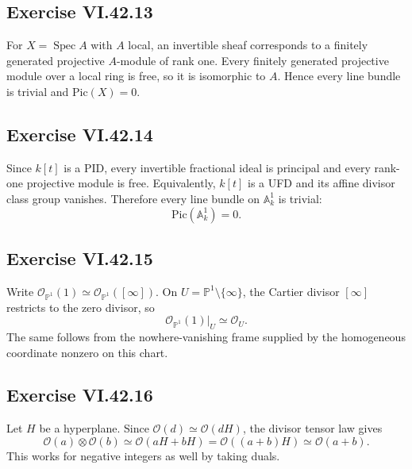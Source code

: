 \subsection*{Exercise VI.42.13}
\begin{solution}
For \(X=\operatorname{Spec}A\) with \(A\) local, an invertible sheaf corresponds to a finitely generated projective \(A\)-module of rank one.  Every finitely generated projective module over a local ring is free, so it is isomorphic to \(A\).  Hence every line bundle is trivial and \(\mathrm{Pic}(X)=0\).
\end{solution}

\subsection*{Exercise VI.42.14}
\begin{solution}
Since \(k[t]\) is a PID, every invertible fractional ideal is principal and every rank-one projective module is free.  Equivalently, \(k[t]\) is a UFD and its affine divisor class group vanishes.  Therefore every line bundle on \(\mathbb A^1_k\) is trivial:
\[
\mathrm{Pic}(\mathbb A^1_k)=0.
\]
\end{solution}

\subsection*{Exercise VI.42.15}
\begin{solution}
Write \(\mathcal O_{\mathbb P^1}(1)\simeq\mathcal O_{\mathbb P^1}([\infty])\).  On \(U=\mathbb P^1\setminus\{\infty\}\), the Cartier divisor \([\infty]\) restricts to the zero divisor, so
\[
\mathcal O_{\mathbb P^1}(1)|_U\simeq\mathcal O_U.
\]
The same follows from the nowhere-vanishing frame supplied by the homogeneous coordinate nonzero on this chart.
\end{solution}

\subsection*{Exercise VI.42.16}
\begin{solution}
Let \(H\) be a hyperplane.  Since \(\mathcal O(d)\simeq\mathcal O(dH)\), the divisor tensor law gives
\[
\mathcal O(a)\otimes\mathcal O(b)
\simeq\mathcal O(aH+bH)
=\mathcal O((a+b)H)
\simeq\mathcal O(a+b).
\]
This works for negative integers as well by taking duals.
\end{solution}

